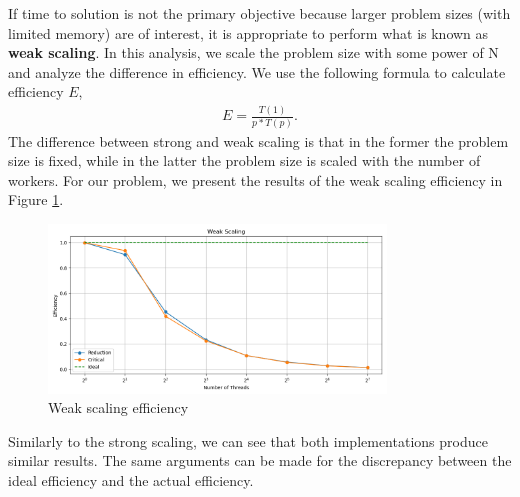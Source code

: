 \documentclass[unicode,11pt,a4paper,oneside,numbers=endperiod,openany]{scrartcl}
\begin{document}
\begin{enumerate}
    If time to solution is not the primary objective because larger problem
    sizes (with limited memory) are of interest, it is appropriate to perform
    what is known as \textbf{weak scaling}. In this analysis, we scale the
    problem size with some power of N and analyze the difference in efficiency.
    We use the following formula to calculate efficiency $E$,
    \begin{align}
      E =  \frac{T(1)}{p*T(p)}.
    \end{align}
    The difference between strong and weak scaling is that in the former the
    problem size is fixed, while in the latter the problem size is scaled with
    the number of workers.
    For our problem, we present the results of the weak scaling efficiency in
    Figure \ref{fig:weak-scaling}.
    \begin{figure}[h]
      \centering
      \includegraphics[width=0.8\textwidth]{../pi/weak_scaling_plot.png}
      \caption{Weak scaling efficiency}
      \label{fig:weak-scaling}
    \end{figure}
    Similarly to the strong scaling, we can see that both implementations
    produce similar results. The same arguments can be made for the discrepancy
    between the ideal efficiency and the actual efficiency.

\end{enumerate}
\end{document}
